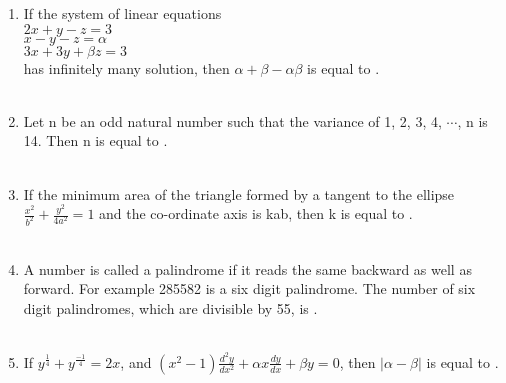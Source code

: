 \documentclass[journal]{IEEEtran}
\numberwithin{equation}{enumi}
\numberwithin{figure}{enumi}
\begin{document}
\begin{enumerate}
    \item If the system of linear equations\\ $2x + y - z = 3$\\ $x - y - z = \alpha$\\ $3x + 3y + \beta z = 3$\\ has infinitely many solution, then $\alpha + \beta - \alpha\beta$ is equal to \underline{\hspace{1cm}}. \\\\
    \item Let n be an odd natural number such that the variance of 1, 2, 3, 4, $\cdots$, n is 14. Then n is equal to \underline{\hspace{1cm}}. \\\\
    \item If the minimum area of the triangle formed by a tangent to the ellipse $\frac{x^{2}}{b^{2}} + \frac{y^{2}}{4a^{2}} = 1$ and the co-ordinate axis is kab, then k is equal to \underline{\hspace{1cm}}. \\\\
    \item A number is called a palindrome if it reads the same backward as well as forward. For example 285582 is a six digit palindrome. The number of six digit palindromes, which are divisible by 55, is \underline{\hspace{1cm}}. \\\\
    \item If $y^{\frac{1}{4}} + y^{\frac{-1}{4}} = 2x$, and $(x^{2} - 1)\frac{d^{2}y}{dx^{2}} + \alpha x\frac{dy}{dx} + \beta y= 0$, then $|\alpha - \beta|$ is equal to \underline{\hspace{1cm}}. \\\\
\end{enumerate}
\end{document}
